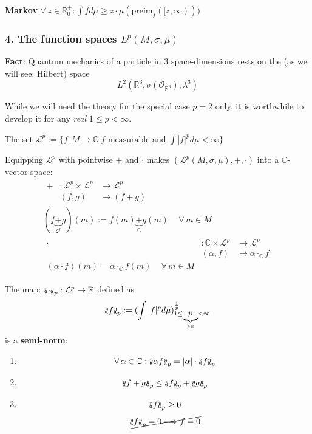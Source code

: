 \textbf{Markov} $\forall \, z \in \mathbb{R}_0^+ : \int f d\mu \geq z \cdot \mu(\text{preim}_f([z, \infty) ))$

\subsubsection{4. The function spaces $L^p(M, \sigma, \mu)$}

\textbf{Fact}: Quantum mechanics of a particle in 3 space-dimensions rests on the (as we will see: Hilbert) space
\[
L^2(\mathbb{R}^3, \sigma(\mathcal{O}_{\mathbb{R}^3} ), \lambda^3)
\]

While we will need the theory for the special case $p=2$ only, it is worthwhile to develop it for any \emph{real} $1 \leq p < \infty$.

\begin{definition}
	The set $\mathcal{L}^p := \lbrace f: M \to \mathbb{C} | f \text{ measurable and } \int |f|^p d\mu < \infty \rbrace$
\end{definition}

Equipping $\mathcal{L}^p$ with pointwise $+$ and $\cdot$ makes $(\mathcal{L}^p(M, \sigma, \mu), +, \cdot)$ into a $\mathbb{C}$-vector space: 
\[
\begin{gathered}
\begin{aligned}
+ & : \mathcal{L}^p \times \mathcal{L}^p & \to \mathcal{L}^p \\
& (f,g) & \mapsto (f + g)
\end{aligned} \\
(f \underbrace{+}_{\mathcal{L}^p} g)(m) := f(m) \underbrace{+}_{\mathbb{C}} g(m) \quad \, \forall \, m \in M \\
\begin{aligned}
	\cdot & : \mathbb{C} \times \mathcal{L}^p & \to \mathcal{L}^p \\
	& (\alpha, f) & \mapsto \alpha \cdot_{\mathbb{C}} f \\
(\alpha \cdot f)(m) = \alpha \cdot_{\mathbb{C}} f(m) \quad \, \forall \, m \in M
\end{aligned}
\end{gathered}
\]

\begin{theorem}
	The map: $ \mathopen{\wr\mkern-2mu\wr}\cdot\mathclose{\wr\mkern-2mu\wr}_p : \mathcal{L}^p \to \mathbb{R}$ defined as 
	\[
	\mathopen{\wr\mkern-2mu\wr}f\mathclose{\wr\mkern-2mu\wr}_p := (\int |f|^p d\mu)^{\frac{1}{p} }_{1\leq \underbrace{p}_{\in \mathbb{R}} < \infty}
	\]
	is a \textbf{semi-norm}:
	\begin{enumerate}
		\item[(i)] 
		\[
		\forall \, \alpha \in \mathbb{C}: \mathopen{\wr\mkern-2mu\wr}\alpha f\mathclose{\wr\mkern-2mu\wr}_p = |\alpha| \cdot \mathopen{\wr\mkern-2mu\wr}f\mathclose{\wr\mkern-2mu\wr}_p
		\]
		\item[(ii)]
		\[
		\mathopen{\wr\mkern-2mu\wr} f + g\mathclose{\wr\mkern-2mu\wr}_p \leq \mathopen{\wr\mkern-2mu\wr} f \mathclose{\wr\mkern-2mu\wr}_p + \mathopen{\wr\mkern-2mu\wr} g\mathclose{\wr\mkern-2mu\wr}_p
		\]
		\item[(iii)]
		\[
		\mathopen{\wr\mkern-2mu\wr}f\mathclose{\wr\mkern-2mu\wr}_p \geq 0
		\]
		\[
		\cancel{ \mathopen{\wr\mkern-2mu\wr}f\mathclose{\wr\mkern-2mu\wr}_p = 0 \Longrightarrow f = 0 }
		\]
	\end{enumerate}
\end{theorem}

